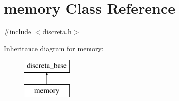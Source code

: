 \hypertarget{classmemory}{}\section{memory Class Reference}
\label{classmemory}


{\ttfamily \#include $<$discreta.\+h$>$}

Inheritance diagram for memory\+:\begin{figure}[H]
\begin{center}
\leavevmode
\includegraphics[height=2.000000cm]{classmemory}
\end{center}
\end{figure}
